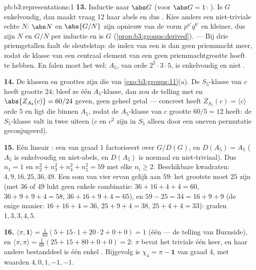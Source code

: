 \begin{solution}{pb:b3:representations:1}
\textbf{13.} Inductie naar $\abs G$ (voor $\abs G = 1$:
). Is $G$ enkelvoudig, dan maakt vraag 12 haar abels en
dus . Kies anders een niet-triviale echte 
$N$: $\abs N$ en $\abs{G/N}$ zijn opnieuw van de vorm
$p^{a'}q^{b'}$ en kleiner, dus zijn $N$ en $G/N$ per inductie
 en is $G$ 
(\cref{prop:b3:groups:derived}). --- Bij drie priemgetallen faalt
de sleutelstap: de index van een  is dan geen
priemmacht meer, zodat de klasse van een centraal element van een
 geen priemmachtgrootte hoeft te hebben. En
falen moet het wel: $A_5$, van orde $2^2\cdot3\cdot5$, is
enkelvoudig en niet .

\textbf{14.} De klassen en groottes zijn die van
\cref{exo:b3:groups:11}(a). De $S_5$-klasse van $c$ heeft grootte
$24$; bleef ze één $A_5$-klasse, dan zou de telling met  en
 $\abs{Z_{A_5}(c)} = 60/24$ geven, geen geheel getal
--- concreet heeft $Z_{S_5}(c) = \langle c\rangle$ orde $5$ en
ligt die binnen $A_5$, zodat de $A_5$-klasse van $c$ grootte
$60/5 = 12$ heeft: de $S_5$-klasse valt in twee uiteen ($c$ en
$c^2$ zijn in $S_5$ alleen door een oneven permutatie
geconjugeerd).

\textbf{15.} Eén lineair : een  van graad $1$
factoriseert over $G/D(G)$, en $D(A_5) = A_5$ ($A_5$ is
enkelvoudig en niet-abels, en $D(A_5)$ is normaal en
niet-triviaal). Dus $n_1 = 1$ en $n_2^2 + n_3^2 + n_4^2 + n_5^2 =
59$ met elke $n_i \geq 2$. Beschikbare kwadraten: $4, 9, 16, 25,
36, 49$. Een som van vier ervan gelijk aan $59$: het grootste moet
$25$ zijn (met $36$ of $49$ lukt geen enkele combinatie: $36 + 16
+ 4 + 4 = 60$, $36 + 9 + 9 + 4 = 58$, $36 + 16 + 9 + 4 = 65$), en
$59 - 25 = 34 = 16 + 9 + 9$ (de enige manier: $16 + 16 + 4 = 36$,
$25 + 9 + 4 = 38$, $25 + 4 + 4 = 33$): graden $1, 3, 3, 4, 5$.

\textbf{16.} $\langle\pi, \mathbf 1\rangle = \frac1{60}(5 +
15\cdot1 + 20\cdot2 + 0 + 0) = 1$ (één  --- de telling van
Burnside), en $\langle\pi, \pi\rangle = \frac1{60}(25 + 15 + 80 +
0 + 0) = 2$: $\pi$ bevat het triviale  één keer, en haar
andere bestanddeel is één enkel  . Bijgevolg is
$\chi_4 = \pi - \mathbf 1$  van graad $4$, met waarden
$4, 0, 1, -1, -1$.


\end{solution}
